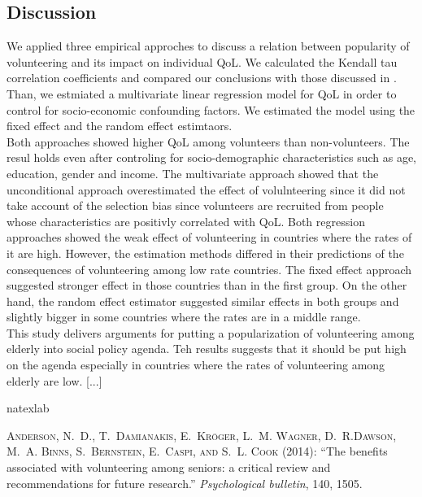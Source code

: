 \documentclass[10pt, letterpaper]{article}
\begin{document}
\begin{spacing}{1.4}
 
\section{Discussion}

We applied three  empirical approches to discuss a relation between popularity of volunteering and its impact on individual QoL. We calculated the Kendall tau correlation coefficients and compared  our conclusions with those discussed in \citet{haski09}. Than, we estmiated a multivariate linear regression model  for QoL in order to control for socio-economic confounding factors. We estimated the model  using the fixed effect and the random effect estimtaors.\\

Both approaches showed higher QoL among volunteers than non-volunteers. The resul holds even after controling for socio-demographic characteristics such as age, education, gender and income. The multivariate approach showed that the unconditional approach overestimated the effect of volulnteering since it did not take account of the selection bias since volunteers are recruited from people whose characteristics are positivly correlated with QoL. Both regression approaches showed the weak effect of volunteering in countries where the rates of it  are high. However, the estimation methods differed in their predictions of the consequences of volunteering among low rate countries. The fixed effect approach suggested stronger effect in those countries than in the first group. On the other hand, the random effect estimator  suggested similar effects in both groups and slightly bigger in some countries where the rates are in a middle range. \\

This study delivers arguments for putting a popularization of volunteering among elderly into social policy agenda. Teh results suggests that it should be put high on the agenda especially in countries where the rates of volunteering among elderly are low.  [...]

\begin{thebibliography}{87}
\newcommand{\enquote}[1]{``#1''}
\expandafter\ifx\csname natexlab\endcsname\relax\def\natexlab#1{#1}\fi

\textsc{Anderson, N.~D., T.~Damianakis, E.~Kr{\"o}ger, L.~M. Wagner, D.~R.Dawson, M.~A. Binns, S.~Bernstein, E.~Caspi, and S.~L. Cook} (2014):  \enquote{The benefits associated with volunteering among seniors: a critical  review and recommendations for future research.} \emph{Psychological bulletin}, 140, 1505.


\end{thebibliography}
\end{spacing}
\end{document}

